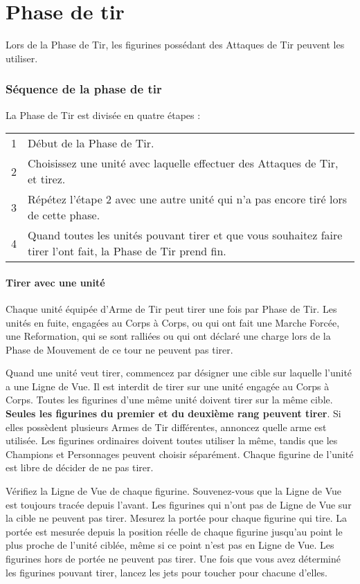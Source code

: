 
\part{Phase de tir}

Lors de la Phase de Tir, les figurines possédant des Attaques de Tir peuvent les utiliser.

\section{Séquence de la phase de tir}

La Phase de Tir est divisée en quatre étapes :

\hspace*{0.3cm}
\begin{tabular}{c|m{14cm}}
1 & Début de la Phase de Tir. \tabularnewline
2 & Choisissez une unité avec laquelle effectuer des Attaques de Tir, et tirez. \tabularnewline
3 & Répétez l'étape 2 avec une autre unité qui n'a pas encore tiré lors de cette phase. \tabularnewline
4 & Quand toutes les unités pouvant tirer et que vous souhaitez faire tirer l'ont fait, la Phase de Tir prend fin. \tabularnewline
\end{tabular}

\subsection{Tirer avec une unité}

Chaque unité équipée d'Arme de Tir peut tirer une fois par Phase de Tir. Les unités en fuite, engagées au Corps à Corps, ou qui ont fait une Marche Forcée, une Reformation, qui se sont ralliées ou qui ont déclaré une charge lors de la Phase de Mouvement de ce tour ne peuvent pas tirer.

Quand une unité veut tirer, commencez par désigner une cible sur laquelle l'unité a une Ligne de Vue. Il est interdit de tirer sur une unité engagée au Corps à Corps. Toutes les figurines d'une même unité doivent tirer sur la même cible. \textbf{Seules les figurines du premier et du deuxième rang peuvent tirer}. Si elles possèdent plusieurs Armes de Tir différentes, annoncez quelle arme est utilisée. Les figurines ordinaires doivent toutes utiliser la même, tandis que les Champions et Personnages peuvent choisir séparément. Chaque figurine de l'unité est libre de décider de ne pas tirer.

Vérifiez la Ligne de Vue de chaque figurine. Souvenez-vous que la Ligne de Vue est toujours tracée depuis l'avant. Les figurines qui n'ont pas de Ligne de Vue sur la cible ne peuvent pas tirer. Mesurez la portée pour chaque figurine qui tire. La portée est mesurée depuis la position réelle de chaque figurine jusqu'au point le plus proche de l'unité ciblée, même si ce point n'est pas en Ligne de Vue. Les figurines hors de portée ne peuvent pas tirer. Une fois que vous avez déterminé les figurines pouvant tirer, lancez les jets pour toucher pour chacune d'elles.

